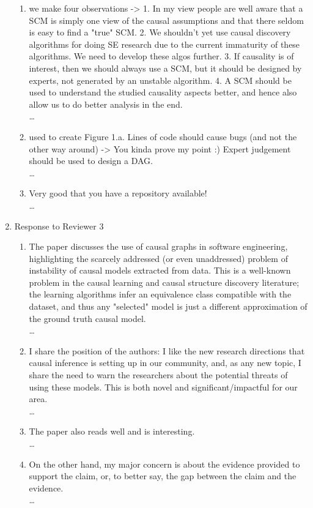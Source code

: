 \documentclass[]{svjour3}
\begin{document}
\begin{enumerate}
\begin{enumerate}
    \item we make four observations ->
1. In my view people are well aware that a SCM is simply one view of the causal assumptions and that there seldom is easy to find a "true" SCM.
2. We shouldn't yet use causal discovery algorithms for doing SE research due to the current immaturity of these algorithms. We need to develop these algos further.
3. If causality is of interest, then we should always use a SCM, but it should be designed by experts, not generated by an unstable algorithm.
4. A SCM should be used to understand the studied causality aspects better, and hence also allow us to do better analysis in the end.\\{\MARK \dots}
\item used to create Figure 1.a. Lines of code should cause bugs (and not the other way around) -> You kinda prove my point :) Expert judgement should be used to design a DAG.\\{\MARK \dots}
\item Very good that you have a repository available!\\{\MARK \dots}
    \end{enumerate}
    \item Response to Reviewer 3
    \begin{enumerate}
        \item The paper discusses the use of causal graphs in software engineering, highlighting the scarcely addressed (or even unaddressed) problem of instability of causal models extracted from data. This is a well-known problem in the causal learning and causal structure discovery literature; the learning algorithms infer an equivalence class compatible with the dataset, and thus any "selected" model is just a different approximation of the ground truth causal model.\\{\MARK \dots}
        \item I share the position of the authors: I like the new research directions that causal inference is setting up in our community, and, as any new topic, I share the need to warn the researchers about the potential threats of using these models. This is both novel and significant/impactful for our area.\\{\MARK \dots}
        \item The paper also reads well and is interesting.\\{\MARK \dots}
        \item On the other hand, my major concern is about the evidence provided to support the claim, or, to better say, the gap between the claim and the evidence.\\{\MARK \dots}

\end{enumerate}
\end{enumerate}
\end{document}
